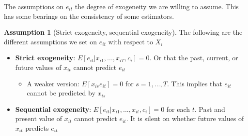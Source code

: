 \documentclass[12pt]{article}
\theoremstyle{definition}
\theoremstyle{property}
\theoremstyle{assumption}
\newtheorem{assumption}{Assumption}[section]
\theoremstyle{example}
\theoremstyle{comment}
\begin{document}
The assumptions on $e_{it}$ the degree of exogeneity we are willing to assume. This has some bearings on the consistency of some estimators.
\begin{mdframed}[backgroundcolor=blue!5] 
\begin{assumption}[Strict exogeneity, sequential exogeneity]
The following are the different assumptions we set on $e_{it}$ with respect to $X_i$
\begin{itemize}
\item \textbf{Strict exogeneity}: $E[e_{it}|x_{i1},...,x_{iT},c_i]=0$. Or that the past, current, or future values of $x_{it}$ cannot predict $e_{it}$
\begin{itemize}
\item A weaker version: $E[x_{is}e_{it}]=0$ for $s=1,...,T$. This implies that $e_{it}$ cannot be predicted by $x_{is}$
\end{itemize}
\item  \textbf{Sequential exogeneity}: $E[e_{it}|x_{i1},...,x_{it},c_i]=0$ for each $t$. Past and present value of $x_{it}$ cannot predict $e_{it}$. It is silent on whether future values of $x_{it}$ predicts $e_{it}$
\end{itemize} 
\end{assumption}
\end{mdframed}
\end{document}

